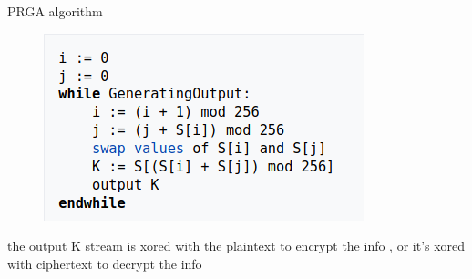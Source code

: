 \documentclass[conference]{IEEEtran}
\begin{document}
\centerline{PRGA algorithm}
\begin{figure}[H]
    \centering
    \includegraphics[width=\linewidth]{PRGA}
\end{figure}

  

the output K stream is xored with the plaintext to encrypt the info , or it's xored with ciphertext to decrypt the info \newline \newline \newline \newline \newline \newline \newline \newline \newline \newline 
\end{document}
